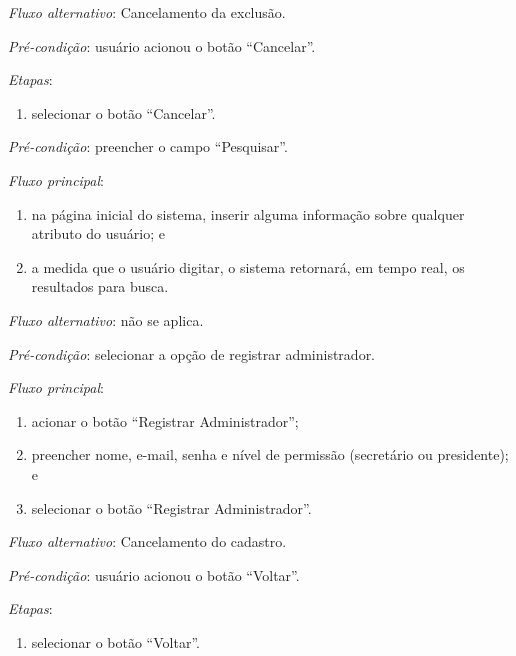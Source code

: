 \documentclass[a4paper,12pt]{article}
\begin{document}
\noindent \textit{Fluxo alternativo}: Cancelamento da exclusão.

\noindent \textit{Pré-condição}: usuário acionou o botão ``Cancelar''.

\noindent \textit{Etapas}:

\begin{enumerate}
    \item selecionar o botão ``Cancelar''.
\end{enumerate}


\vspace{0.7cm}

\noindent \textit{Pré-condição}: preencher o campo ``Pesquisar''.

\noindent \textit{Fluxo principal}:

\begin{enumerate}
    \item na página inicial do sistema, inserir alguma informação sobre qualquer atributo do usuário; e
    \item a medida que o usuário digitar, o sistema retornará, em tempo real, os resultados para busca.
\end{enumerate}

\noindent \textit{Fluxo alternativo}: não se aplica.


\vspace{0.7cm}

\noindent \textit{Pré-condição}: selecionar a opção de registrar administrador.

\noindent \textit{Fluxo principal}:

\begin{enumerate}
    \item acionar o botão ``Registrar Administrador'';
    \item preencher nome, e-mail, senha e nível de permissão (secretário ou presidente); e
    \item selecionar o botão ``Registrar Administrador''.
\end{enumerate}

\noindent \textit{Fluxo alternativo}: Cancelamento do cadastro.

\noindent \textit{Pré-condição}: usuário acionou o botão ``Voltar''.

\noindent \textit{Etapas}:

\begin{enumerate}
    \item selecionar o botão ``Voltar''.
\end{enumerate}
\end{document}
